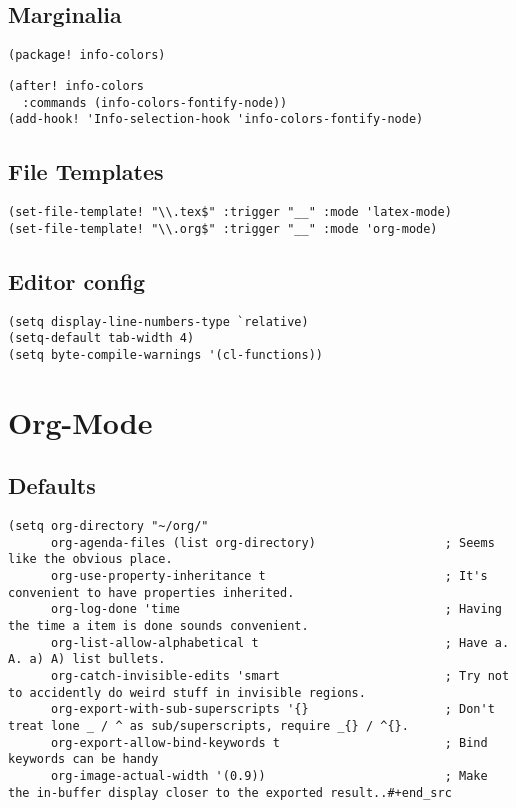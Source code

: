 \documentclass[c]{article}
\theoremstyle{plain}%
\theoremstyle{definition}
\theoremstyle{remark}
\begin{document}
\subsection{Marginalia}
\label{sec:orgea1de39}
\begin{verbatim}
(package! info-colors)
\end{verbatim}
\begin{verbatim}
(after! info-colors
  :commands (info-colors-fontify-node))
(add-hook! 'Info-selection-hook 'info-colors-fontify-node)
\end{verbatim}
\subsection{File Templates}
\label{sec:org959fb93}
\begin{verbatim}
(set-file-template! "\\.tex$" :trigger "__" :mode 'latex-mode)
(set-file-template! "\\.org$" :trigger "__" :mode 'org-mode)
\end{verbatim}
\subsection{Editor config}
\label{sec:orgce3cd40}
\begin{verbatim}
(setq display-line-numbers-type `relative)
(setq-default tab-width 4)
(setq byte-compile-warnings '(cl-functions))
\end{verbatim}
\section{Org-Mode}
\label{sec:org6ff2dd7}
\subsection{Defaults}
\label{sec:org6eea273}
\begin{verbatim}
(setq org-directory "~/org/"
      org-agenda-files (list org-directory)                  ; Seems like the obvious place.
      org-use-property-inheritance t                         ; It's convenient to have properties inherited.
      org-log-done 'time                                     ; Having the time a item is done sounds convenient.
      org-list-allow-alphabetical t                          ; Have a. A. a) A) list bullets.
      org-catch-invisible-edits 'smart                       ; Try not to accidently do weird stuff in invisible regions.
      org-export-with-sub-superscripts '{}                   ; Don't treat lone _ / ^ as sub/superscripts, require _{} / ^{}.
      org-export-allow-bind-keywords t                       ; Bind keywords can be handy
      org-image-actual-width '(0.9))                         ; Make the in-buffer display closer to the exported result..#+end_src
\end{verbatim}
\end{document}
